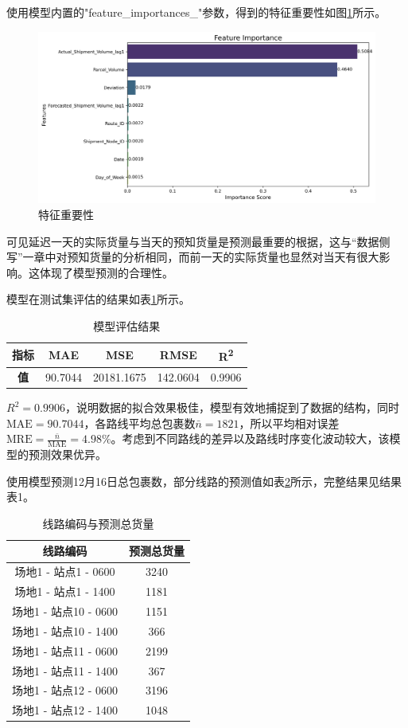 \documentclass{MMCStyle}
\begin{document}
使用模型内置的"feature\_importances\_"参数，得到的特征重要性如图\ref{fig:8}所示。

\begin{figure}[htb]
	\centering
	\includegraphics[width=\linewidth]{特征重要性.png}
	\caption{特征重要性}
	\label{fig:8}
\end{figure}

可见延迟一天的实际货量与当天的预知货量是预测最重要的根据，这与“数据侧写”一章中对预知货量的分析相同，而前一天的实际货量也显然对当天有很大影响。这体现了模型预测的合理性。

模型在测试集评估的结果如表\ref{tab:3}所示。

\begin{table}[h]
\centering
\caption{模型评估结果}
\label{tab:3}
\begin{tabular}{|c|c|c|c|c|}
\hline
\textbf{指标} & MAE & MSE & RMSE & R\textsuperscript{2} \\ \hline
\textbf{值}   & 90.7044 & 20181.1675 & 142.0604 & 0.9906 \\ \hline
\end{tabular}
\end{table}

\(R^2 = 0.9906\)，说明数据的拟合效果极佳，模型有效地捕捉到了数据的结构，同时\(\text{MAE} = 90.7044\)，各路线平均总包裹数\(\bar{n} = 1821\)，所以平均相对误差\(\text{MRE} = \frac{\bar{n}}{\text{MAE}} = 4.98\%\)。考虑到不同路线的差异以及路线时序变化波动较大，该模型的预测效果优异。

使用模型预测12月16日总包裹数，部分线路的预测值如表\ref{tab:4}所示，完整结果见结果表1。
\begin{table}[h]
\centering
\caption{线路编码与预测总货量}
\label{tab:4}
\begin{tabular}{|c|c|}
\hline
\textbf{线路编码} & \textbf{预测总货量} \\ \hline
场地1 - 站点1 - 0600 & 3240 \\ \hline
场地1 - 站点1 - 1400 & 1181 \\ \hline
场地1 - 站点10 - 0600 & 1151 \\ \hline
场地1 - 站点10 - 1400 & 366 \\ \hline
场地1 - 站点11 - 0600 & 2199 \\ \hline
场地1 - 站点11 - 1400 & 367 \\ \hline
场地1 - 站点12 - 0600 & 3196 \\ \hline
场地1 - 站点12 - 1400 & 1048 \\ \hline
\end{tabular}
\end{table}
\end{document}
